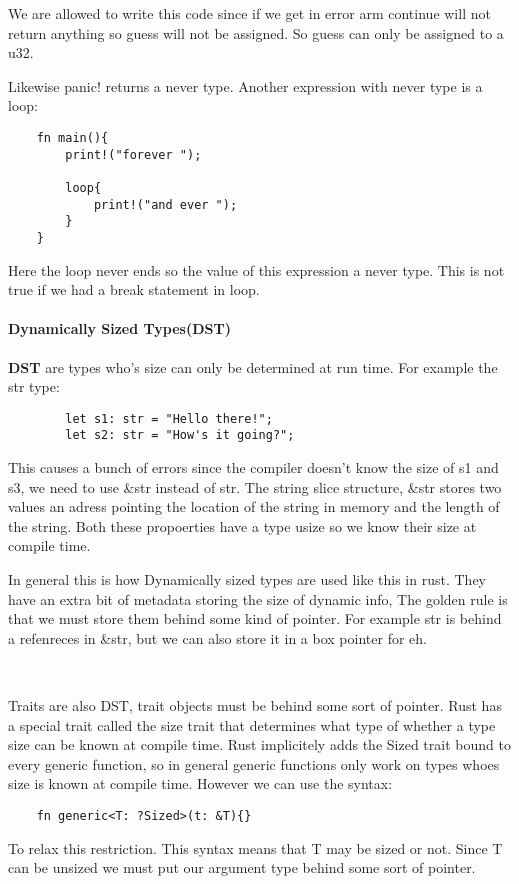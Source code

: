 We are allowed to write this code since if we get in error arm continue will not return anything so guess will not be assigned. So guess can only be assigned to a u32.


Likewise panic! returns a never type. Another expression with never type is a loop:\begin{lstlisting}
    fn main(){
        print!("forever ");

        loop{
            print!("and ever ");
        }
    }
\end{lstlisting}

Here the loop never ends so the value of this expression a never type. This is not true if we had a break statement in loop.


\paragraph*{Dynamically Sized Types(DST)}

\begin{definition}
    \textbf{DST} are types who's size can only be determined at run time. For example the str type:\begin{lstlisting}
        let s1: str = "Hello there!";
        let s2: str = "How's it going?";
    \end{lstlisting}

    This causes a bunch of errors since the compiler doesn't know the size of s1 and s3, we need to use \&str instead of str. The string slice structure, \&str stores two values an adress pointing the location of the string in memory and the length of the string. Both these propoerties have a type usize so we know their size at compile time.
\end{definition}

In general this is how Dynamically sized types are used like this in rust. They have an extra bit of metadata storing the size of dynamic info, The golden rule is that we must store them behind some kind of pointer. For example str is behind a refenreces in \&str, but we can also store it in a box pointer for eh.

\

Traits are also DST, trait objects must be behind some sort of pointer. Rust has a special trait called the size trait that determines what type of whether a type size can be known at compile time. Rust implicitely adds the Sized trait bound to every generic function, so in general generic functions only work on types whoes size is known at compile time. However we can use the syntax: \begin{lstlisting}
    fn generic<T: ?Sized>(t: &T){}
\end{lstlisting}
To relax this restriction. This syntax means that T may be sized or not. Since T can be unsized we must put our argument type behind some sort of pointer. 

